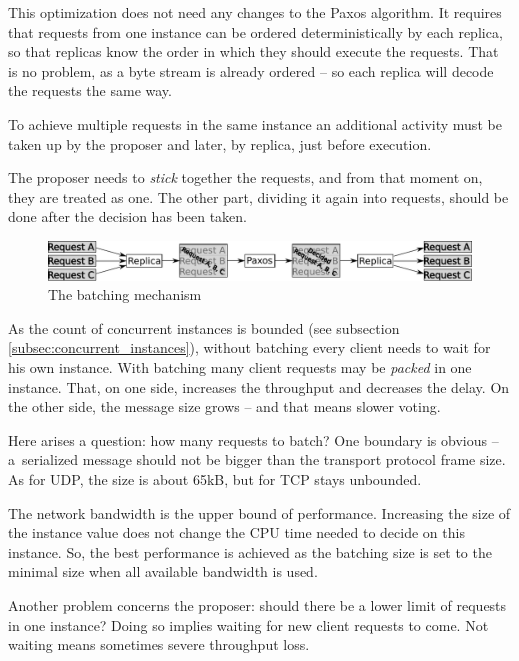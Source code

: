 This optimization does not need any changes to the Paxos algorithm. It requires that requests from one instance can be ordered deterministically by each replica, so that replicas know the order in which they should execute the requests. That is no problem, as a byte stream is already ordered -- so each replica will decode the requests the same way.

To achieve multiple requests in the same instance an additional activity must be taken up by the proposer and later, by replica, just before execution.

The proposer needs to \textit{stick} together the requests, and from that moment on, they are treated as one. The other part, dividing it again into requests, should be done after the decision has been taken.
\begin{figure}[h]
\includegraphics[keepaspectratio, width=\textwidth]{features/batching.pdf}
\vspace{-1em}
\caption{The batching mechanism}
\vspace{-1em}
\end{figure}

As the count of concurrent instances is bounded (see subsection \ref{subsec:concurrent_instances}), without \linebreak batching every client needs to wait for his own instance. With batching many client requests may be \textit{packed} in one instance. That, on one side, increases the throughput and decreases the delay.
On the other side, the message size grows -- and that means slower voting.

Here arises a question: how many requests to batch? One boundary is obvious -- a~serialized message should not be bigger than the transport protocol frame size. As for UDP, the size is about 65kB, but for TCP stays unbounded.

The network bandwidth is the upper bound of performance. Increasing the size of the instance value does not change the CPU time needed to decide on this instance. \linebreak So, the best performance is achieved as the batching size is set to the minimal size when all available bandwidth is used.

Another problem concerns the proposer: should there be a lower limit of requests in one instance? Doing so implies waiting for new client requests to come. Not waiting means sometimes severe throughput loss.

